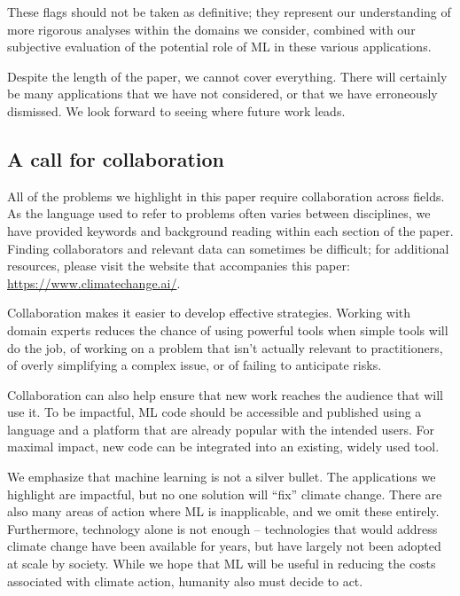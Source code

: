 \documentclass[11pt]{report}
\begin{document}
These flags should not be taken as definitive; they represent our understanding of more rigorous analyses within the domains we consider, combined with our subjective evaluation of the potential role of ML in these various applications.

Despite the length of the paper, we cannot cover everything. There will certainly be many applications that we have not considered, or that we have erroneously dismissed. We look forward to seeing where future work leads.

\subsection*{A call for collaboration}

All of the problems we highlight in this paper require collaboration across fields. As the language used to refer to problems often varies between disciplines, we have provided keywords and background reading within each section of the paper. Finding collaborators and relevant data can sometimes be difficult; for additional resources, please visit the website that accompanies this paper: \url{https://www.climatechange.ai/}.

Collaboration makes it easier to develop effective strategies. Working with domain experts reduces the chance of using powerful tools when simple tools will do the job, of working on a problem that isn't actually relevant to practitioners, of overly simplifying a complex issue,
or of failing to anticipate risks.

Collaboration can also help ensure that new work reaches the audience that will use it. To be impactful, ML code should be accessible and published using a language and a platform that are already popular with the intended users. For maximal impact, new code can be integrated into an existing, widely used tool.

We emphasize that machine learning is not a silver bullet. The applications we highlight are impactful, but no one solution will ``fix'' climate change. There are also many areas of action where ML is inapplicable, and we omit these entirely. Furthermore, technology alone is not enough -- technologies that would address climate change have been available for years, but have largely not been adopted at scale by society. While we hope that ML will be useful in reducing the costs associated with climate action, humanity also must decide to act.
\end{document}
